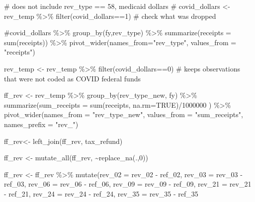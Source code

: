 \documentclass[
  letterpaper,
  DIV=11,
  numbers=noendperiod]{scrreport}
\newenvironment{Shaded}{\begin{snugshade}}{\end{snugshade}}
\newcommand{\AttributeTok}[1]{\textcolor[rgb]{0.40,0.45,0.13}{#1}}
\newcommand{\CommentTok}[1]{\textcolor[rgb]{0.37,0.37,0.37}{#1}}
\newcommand{\ConstantTok}[1]{\textcolor[rgb]{0.56,0.35,0.01}{#1}}
\newcommand{\DecValTok}[1]{\textcolor[rgb]{0.68,0.00,0.00}{#1}}
\newcommand{\FunctionTok}[1]{\textcolor[rgb]{0.28,0.35,0.67}{#1}}
\newcommand{\NormalTok}[1]{\textcolor[rgb]{0.00,0.23,0.31}{#1}}
\newcommand{\OtherTok}[1]{\textcolor[rgb]{0.00,0.23,0.31}{#1}}
\newcommand{\SpecialCharTok}[1]{\textcolor[rgb]{0.37,0.37,0.37}{#1}}
\newcommand{\StringTok}[1]{\textcolor[rgb]{0.13,0.47,0.30}{#1}}
\begin{document}
\begin{Shaded}
\begin{Highlighting}[]
\CommentTok{\# does not include rev\_type == 58, medicaid dollars}
\CommentTok{\# covid\_dollars \textless{}{-} rev\_temp \%\textgreater{}\% filter(covid\_dollars==1) \# check what was dropped}

\CommentTok{\#covid\_dollars \%\textgreater{}\% group\_by(fy,rev\_type) \%\textgreater{}\% summarize(receipts = sum(receipts)) \%\textgreater{}\% pivot\_wider(names\_from="rev\_type", values\_from = "receipts")}


\NormalTok{rev\_temp }\OtherTok{\textless{}{-}}\NormalTok{ rev\_temp }\SpecialCharTok{\%\textgreater{}\%}  \FunctionTok{filter}\NormalTok{(covid\_dollars}\SpecialCharTok{==}\DecValTok{0}\NormalTok{) }\CommentTok{\# keeps observations that were not coded as COVID federal funds}



\NormalTok{ff\_rev }\OtherTok{\textless{}{-}}\NormalTok{ rev\_temp }\SpecialCharTok{\%\textgreater{}\%} 
  \FunctionTok{group\_by}\NormalTok{(rev\_type\_new, fy) }\SpecialCharTok{\%\textgreater{}\%} 
  \FunctionTok{summarize}\NormalTok{(}\AttributeTok{sum\_receipts =} \FunctionTok{sum}\NormalTok{(receipts, }\AttributeTok{na.rm=}\ConstantTok{TRUE}\NormalTok{)}\SpecialCharTok{/}\DecValTok{1000000}\NormalTok{ ) }\SpecialCharTok{\%\textgreater{}\%}
  \FunctionTok{pivot\_wider}\NormalTok{(}\AttributeTok{names\_from =} \StringTok{"rev\_type\_new"}\NormalTok{, }\AttributeTok{values\_from =} \StringTok{"sum\_receipts"}\NormalTok{, }\AttributeTok{names\_prefix =} \StringTok{"rev\_"}\NormalTok{)}

\NormalTok{ff\_rev}\OtherTok{\textless{}{-}} \FunctionTok{left\_join}\NormalTok{(ff\_rev, tax\_refund)}

\NormalTok{ff\_rev }\OtherTok{\textless{}{-}} \FunctionTok{mutate\_all}\NormalTok{(ff\_rev, }\SpecialCharTok{\textasciitilde{}}\FunctionTok{replace\_na}\NormalTok{(.,}\DecValTok{0}\NormalTok{))}


\NormalTok{ff\_rev }\OtherTok{\textless{}{-}}\NormalTok{ ff\_rev }\SpecialCharTok{\%\textgreater{}\%}
  \FunctionTok{mutate}\NormalTok{(}\AttributeTok{rev\_02 =}\NormalTok{ rev\_02 }\SpecialCharTok{{-}}\NormalTok{ ref\_02,}
         \AttributeTok{rev\_03 =}\NormalTok{ rev\_03 }\SpecialCharTok{{-}}\NormalTok{ ref\_03,}
         \AttributeTok{rev\_06 =}\NormalTok{ rev\_06 }\SpecialCharTok{{-}}\NormalTok{ ref\_06,}
         \AttributeTok{rev\_09 =}\NormalTok{ rev\_09 }\SpecialCharTok{{-}}\NormalTok{ ref\_09,}
         \AttributeTok{rev\_21 =}\NormalTok{ rev\_21 }\SpecialCharTok{{-}}\NormalTok{ ref\_21,}
         \AttributeTok{rev\_24 =}\NormalTok{ rev\_24 }\SpecialCharTok{{-}}\NormalTok{ ref\_24,}
         \AttributeTok{rev\_35 =}\NormalTok{ rev\_35 }\SpecialCharTok{{-}}\NormalTok{ ref\_35}


\end{Highlighting}
\end{Shaded}
\end{document}
